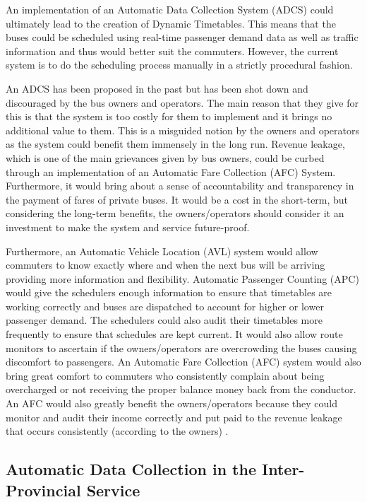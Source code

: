 \documentclass[12pt, oneside]{report}
\begin{document}
An implementation of an Automatic Data Collection System (ADCS) could ultimately lead to the creation of Dynamic Timetables. This means that the buses could be scheduled using real-time passenger demand data as well as traffic information and thus would better suit the commuters. However, the current system is to do the scheduling process manually in a strictly procedural fashion.

An ADCS has been proposed in the past but has been shot down and discouraged by the bus owners and operators. The main reason that they give for this is that the system is too costly for them to implement and it brings no additional value to them. This is a misguided notion by the owners and operators as the system could benefit them immensely in the long run. Revenue leakage, which is one of the main grievances given by bus owners, could be curbed through an implementation of an Automatic Fare Collection (AFC) System. Furthermore, it would bring about a sense of accountability and transparency in the payment of fares of private buses. It would be a cost in the short-term, but considering the long-term benefits, the owners/operators should consider it an investment to make the system and service future-proof.

Furthermore, an Automatic Vehicle Location (AVL) system would allow commuters to know exactly where and when the next bus will be arriving providing more information and flexibility. Automatic Passenger Counting (APC) would give the schedulers enough information to ensure that timetables are working correctly and buses are dispatched to account for higher or lower passenger demand. The schedulers could also audit their timetables more frequently to ensure that schedules are kept current. It would also allow route monitors to ascertain if the owners/operators are overcrowding the buses causing discomfort to passengers. An Automatic Fare Collection (AFC) system would also bring great comfort to commuters who consistently complain about being overcharged or not receiving the proper balance money back from the conductor. An AFC would also greatly benefit the owners/operators because they could monitor and audit their income correctly and put paid to the revenue leakage that occurs consistently (according to the owners) \citep{Wilson2008, Wilson2009, Wilson2012, Fijalkowski2010}.

\subsection{Automatic Data Collection in the Inter-Provincial Service} 
\end{document}
